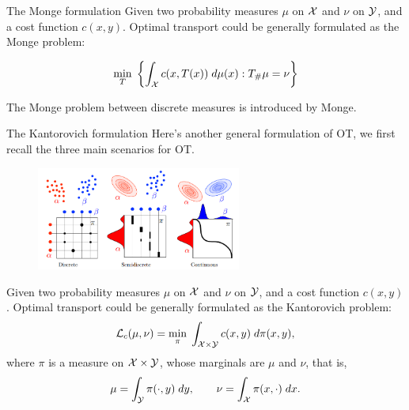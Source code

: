 \begin{frame}{The Monge formulation}
    \pause
    \vspace{-1em}
    Given two probability measures $\mu$ on $\mathcal{X}$ and $\nu$ on $\mathcal{Y}$, and a 
    cost function $c(x,y)$. 
    Optimal transport could be generally formulated as the 
    Monge problem:

    \vspace{-.2em}
    \begin{equation}
        \min_T\;\left\{\int_{\mathcal{X}} c(x,T(x))\;d\mu(x) : T_\#\mu = \nu \right\}
    \end{equation}

    \vspace{-.5em}
    The Monge problem between discrete measures is 
    introduced by Monge.
\end{frame}

\begin{frame}{The Kantorovich formulation}
    \footnotesize
    Here's another general formulation of OT, 
    we first recall the three main scenarios for OT.

    \begin{figure}
        \captionsetup{font=scriptsize}
        \centering
        \includegraphics[width=0.6\textwidth]{png/3TypesOfOT.png}
    \end{figure}

    \pause
    Given two probability measures $\mu$ on $\mathcal{X}$ and $\nu$ on $\mathcal{Y}$, and a 
    cost function $c(x,y)$. 
    Optimal transport could be generally formulated as
    the Kantorovich problem:
    \begin{equation}
        \mathcal{L}_c(\mu,\nu)=\min_\pi \; \int_{\mathcal{X}\times \mathcal{Y}} c(x,y) \;d\pi(x,y),
    \end{equation}
    where $\pi$ is a measure on $\mathcal{X}\times \mathcal{Y}$, whose
    marginals are $\mu$ and $\nu$, that is,
    \begin{equation}
        \mu = \int_{\mathcal{Y}} \pi(\cdot, y) \;dy,\qquad 
        \nu = \int_{\mathcal{X}} \pi(x, \cdot) \;dx.
    \end{equation}
\end{frame}

